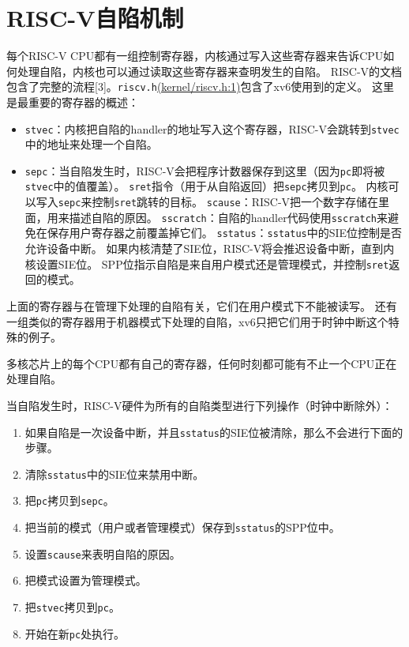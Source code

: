 \section{RISC-V自陷机制}
每个RISC-V CPU都有一组控制寄存器，内核通过写入这些寄存器来告诉CPU如何处理自陷，内核也可以通过读取这些寄存器来查明发生的自陷。
RISC-V的文档包含了完整的流程[3]。\texttt{riscv.h}\href{https://github.com/mit-pdos/xv6-riscv/blob/risc/kernel/riscv.h#L1}{(kernel/riscv.h:1)}包含了xv6使用到的定义。
这里是最重要的寄存器的概述：
\begin{itemize}
    \item \texttt{stvec}：内核把自陷的handler的地址写入这个寄存器，RISC-V会跳转到\texttt{stvec}中的地址来处理一个自陷。
    \item \texttt{sepc}：当自陷发生时，RISC-V会把程序计数器保存到这里（因为\texttt{pc}即将被\texttt{stvec}中的值覆盖）。
    \texttt{sret}指令（用于从自陷返回）把\texttt{sepc}拷贝到\texttt{pc}。
    内核可以写入\texttt{sepc}来控制\texttt{sret}跳转的目标。
    \texttt{scause}：RISC-V把一个数字存储在里面，用来描述自陷的原因。
    \texttt{sscratch}：自陷的handler代码使用\texttt{sscratch}来避免在保存用户寄存器之前覆盖掉它们。
    \texttt{sstatus}：\texttt{sstatus}中的SIE位控制是否允许设备中断。
    如果内核清楚了SIE位，RISC-V将会推迟设备中断，直到内核设置SIE位。
    SPP位指示自陷是来自用户模式还是管理模式，并控制\texttt{sret}返回的模式。
\end{itemize}

上面的寄存器与在管理下处理的自陷有关，它们在用户模式下不能被读写。
还有一组类似的寄存器用于机器模式下处理的自陷，xv6只把它们用于时钟中断这个特殊的例子。

多核芯片上的每个CPU都有自己的寄存器，任何时刻都可能有不止一个CPU正在处理自陷。

当自陷发生时，RISC-V硬件为所有的自陷类型进行下列操作（时钟中断除外）：
\begin{enumerate}
    \item 如果自陷是一次设备中断，并且\texttt{sstatus}的SIE位被清除，那么不会进行下面的步骤。
    \item 清除\texttt{sstatus}中的SIE位来禁用中断。
    \item 把\texttt{pc}拷贝到\texttt{sepc}。
    \item 把当前的模式（用户或者管理模式）保存到\texttt{sstatus}的SPP位中。
    \item 设置\texttt{scause}来表明自陷的原因。
    \item 把模式设置为管理模式。
    \item 把\texttt{stvec}拷贝到\texttt{pc}。
    \item 开始在新\texttt{pc}处执行。
\end{enumerate}

